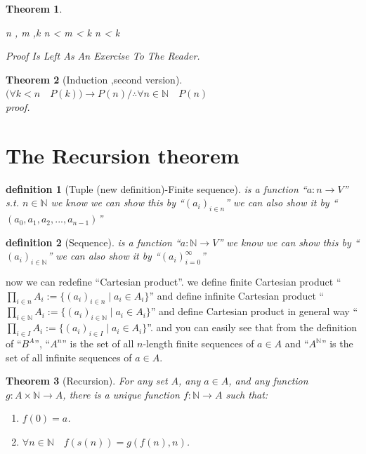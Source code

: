 \documentclass[10pt,a4paper]{book}
\newtheorem{definition}{definition}[section]
\newtheorem{theorem}{Theorem}[section]
\begin{document}
\begin{theorem}
\begin{fitchproof}[arrayenv=tabular]
    \end{fitchproof}

    \begin{fitchproof}[arrayenv=tabular]

         {\forall n , m ,k  \in {} \quad  n < m < k  \to n < k }         

    \end{fitchproof}

    Proof Is Left As An Exercise To The Reader.
\end{theorem}

\begin{theorem}[Induction ,second version]
    $ \Big( \forall  k < n \quad  P(k) \Big) \to P(n)  /\therefore \forall n\in \mathbb{N} \quad P(n)$
    \\
    proof.

\end{theorem}

\section{The Recursion theorem}

\begin{definition}
    [Tuple (new definition)-Finite sequence] is a function ``$a : n \to V$'' s.t. $n \in  \mathbb{N}$ we know we can show this
    by ``$(a_i)_{i \in n}$'' we can also show it by ``$(a_0 , a_1 ,a_2 , ... , a_{n-1})$''
\end{definition}

\begin{definition}
    [Sequence] is a function ``$a : \mathbb{N} \to V$''  we know we can show this
    by ``$(a_i)_{i \in \mathbb{N}}$'' we can also show it by ``$(a_i)_{i = 0}^{\infty}$''
\end{definition}

now we can redefine ``Cartesian product''. we define finite Cartesian product
``$\prod_{i \in n} A_i := \{ (a_i)_{i \in n} \mid a_i \in A_i \}$'' and define
infinite Cartesian product ``$\prod_{i \in \mathbb{N}} A_i := \{ (a_i)_{i \in
        \mathbb{N}} \mid a_i \in A_i \}$'' and define Cartesian product in general way
``$\prod_{i \in I} A_i := \{ (a_i)_{i \in I} \mid a_i \in A_i \}$''. and you
can easily see that from the definition of ``$B^A$'', ``$A^n$'' is the set of
all $n$-length finite sequences of $a \in A$ and ``$A^\mathbb{N}$'' is the set
of all infinite sequences of $a \in A$.

\begin{theorem}[Recursion]
    For any set $A$, any $a \in A$, and any function $g : A \times \mathbb{N} \to A$,
    there is a unique function $f : \mathbb{N} \to A$ such that:
    \begin{enumerate}
        \setlength{\itemsep}{0pt}
        \item $f(0) = a$.
        \item $\forall n \in \mathbb{N} \quad f(s(n)) = g(f(n),n)$.
    \end{enumerate}
\end{theorem}
\end{document}
